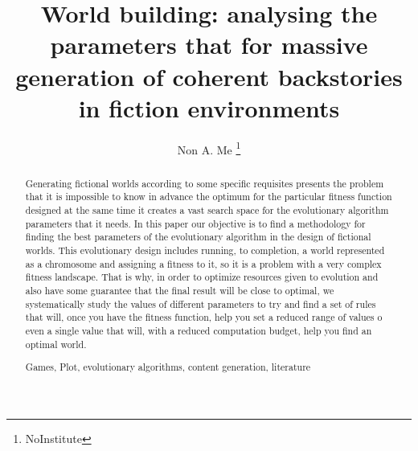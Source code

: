 \documentclass[runningheads,a4paper]{llncs}
\newcommand{\keywords}[1]{\par\addvspace\baselineskip
\noindent\keywordname\enspace\ignorespaces#1}
\begin{document}
\mainmatter  %

\title{World building: analysing the parameters that for massive generation of coherent backstories in fiction environments}


%
%
\author{Non A. Me%
\thanks{NoInstitute}}
%


%
%

\maketitle


\begin{abstract}
Generating fictional worlds according to some specific requisites
presents the problem that it is impossible to know in advance the optimum for the
particular fitness function designed at the same time it creates a
vast search space for the evolutionary algorithm parameters that it
needs. In this paper our objective is to find a methodology for finding the
best parameters of the evolutionary algorithm in the design of
fictional worlds. This evolutionary design includes running, to
completion, a world represented as a chromosome and assigning a fitness to it, so it is a problem
with a very complex fitness landscape. That is why, in order to
optimize resources given to evolution and also have some guarantee
that the final result will be close to optimal, we systematically
study the values of different parameters to try and find a set of
rules that will, once you have the fitness function, help you set a
reduced range of values o even a single value that will, with a
reduced computation budget, help you find an optimal world.

\keywords{Games, Plot, evolutionary algorithms, content generation, literature}
\end{abstract}
\end{document}
